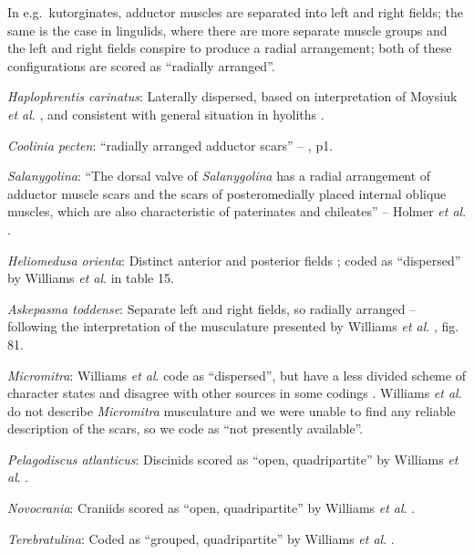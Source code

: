 \documentclass[]{book}
\theoremstyle{definition}
\theoremstyle{definition}
\theoremstyle{definition}
\theoremstyle{remark}
\begin{document}
In e.g.~kutorginates, adductor muscles are separated into left and right
fields; the same is the case in lingulids, where there are more separate
muscle groups and the left and right fields conspire to produce a radial
arrangement; both of these configurations are scored as ``radially
arranged''.

\emph{Haplophrentis carinatus}: Laterally dispersed, based on
interpretation of Moysiuk \emph{et al}.
\citeyearpar{Moysiuk2017Hyolithsare}, and consistent with general
situation in hyoliths \citep[see][]{Dzik1980Ontogenyof}.

\emph{Coolinia pecten}: ``radially arranged adductor scars'' --
\citet{Bassett2017Earliestontogeny}, p1.

\emph{Salanygolina}: ``The dorsal valve of \emph{Salanygolina} has a
radial arrangement of adductor muscle scars and the scars of
posteromedially placed internal oblique muscles, which are also
characteristic of paterinates and chileates'' -- Holmer \emph{et al}.
\citeyearpar{Holmer2009Theenigmatic}.

\emph{Heliomedusa orienta}: Distinct anterior and posterior fields
\citep{Chen2007Reinterpretationof}; coded as ``dispersed'' by Williams
\emph{et al}. \citeyearpar{Williams2000BrachiopodaLinguliformea} in
table 15.

\emph{Askepasma toddense}: Separate left and right fields, so radially
arranged -- following the interpretation of the musculature presented by
Williams \emph{et al}.
\citeyearpar{Williams2000BrachiopodaLinguliformea}, fig. 81.

\emph{Micromitra}: Williams \emph{et al}.
\citeyearpar{Williams1998Thediversity} code as ``dispersed'', but have a
less divided scheme of character states and disagree with other sources
in some codings \citep[e.g.][in
Kutorginates]{Bassett2001Functionalmorphology}. Williams \emph{et al}.
\citeyearpar{Williams2000BrachiopodaLinguliformea} do not describe
\emph{Micromitra} musculature and we were unable to find any reliable
description of the scars, so we code as ``not presently available''.

\emph{Pelagodiscus atlanticus}: Discinids scored as ``open,
quadripartite'' by Williams \emph{et al}.
\citeyearpar{Williams1996Asupra}.

\emph{Novocrania}: Craniids scored as ``open, quadripartite'' by
Williams \emph{et al}. \citeyearpar{Williams1996Asupra}.

\emph{Terebratulina}: Coded as ``grouped, quadripartite'' by Williams
\emph{et al}. \citeyearpar{Williams1996Asupra}.
\end{document}
